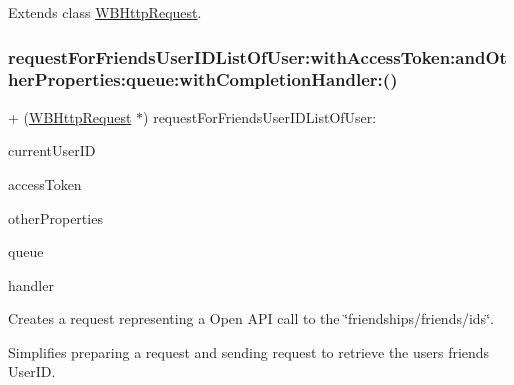 Extends class \mbox{\hyperlink{interface_w_b_http_request_a6bec26ae942e00b30352846353c10f4d}{W\+B\+Http\+Request}}.

\mbox{\label{category_w_b_http_request_07_weibo_user_08_a388ba16ea6e89e121893833f2a7d7b86}} 
\subsubsection{\texorpdfstring{request\+For\+Friends\+User\+I\+D\+List\+Of\+User\+:with\+Access\+Token\+:and\+Other\+Properties\+:queue\+:with\+Completion\+Handler\+:()}{requestForFriendsUserIDListOfUser:withAccessToken:andOtherProperties:queue:withCompletionHandler:()}\hspace{0.1cm}{\footnotesize\ttfamily [1/3]}}
{\footnotesize\ttfamily + (\mbox{\hyperlink{interface_w_b_http_request}{W\+B\+Http\+Request}} $\ast$) request\+For\+Friends\+User\+I\+D\+List\+Of\+User\+: \begin{DoxyParamCaption}\item[{(N\+S\+String $\ast$)}]{current\+User\+ID }\item[{withAccessToken:(N\+S\+String $\ast$)}]{access\+Token }\item[{andOtherProperties:(N\+S\+Dictionary $\ast$)}]{other\+Properties }\item[{queue:(N\+S\+Operation\+Queue $\ast$)}]{queue }\item[{withCompletionHandler:(W\+B\+Request\+Handler)}]{handler }\end{DoxyParamCaption}}

Creates a request representing a Open A\+PI call to the \char`\"{}friendships/friends/ids\char`\"{}.

Simplifies preparing a request and sending request to retrieve the user\textquotesingle{}s friends\textquotesingle{} User\+ID.


